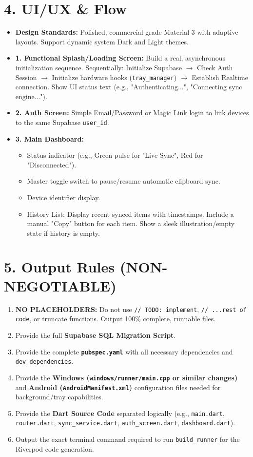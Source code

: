\documentclass[11pt, a4paper]{article}
\begin{document}
\section*{4. UI/UX \& Flow}
\begin{itemize}
    \item \textbf{Design Standards:} Polished, commercial-grade Material 3 with adaptive layouts. Support dynamic system Dark and Light themes.
    \item \textbf{1. Functional Splash/Loading Screen:} Build a real, asynchronous initialization sequence. Sequentially: Initialize Supabase $\rightarrow$ Check Auth Session $\rightarrow$ Initialize hardware hooks (\texttt{tray\_manager}) $\rightarrow$ Establish Realtime connection. Show UI status text (e.g., "Authenticating...", "Connecting sync engine...").
    \item \textbf{2. Auth Screen:} Simple Email/Password or Magic Link login to link devices to the same Supabase \texttt{user\_id}.
    \item \textbf{3. Main Dashboard:}
    \begin{itemize}
        \item Status indicator (e.g., Green pulse for "Live Sync", Red for "Disconnected").
        \item Master toggle switch to pause/resume automatic clipboard sync.
        \item Device identifier display.
        \item History List: Display recent synced items with timestamps. Include a manual "Copy" button for each item. Show a sleek illustration/empty state if history is empty.
    \end{itemize}
\end{itemize}

\section*{5. Output Rules (NON-NEGOTIABLE)}
\begin{enumerate}
    \item \textbf{NO PLACEHOLDERS:} Do not use \texttt{// TODO: implement}, \texttt{// ...rest of code}, or truncate functions. Output 100\% complete, runnable files.
    \item Provide the full \textbf{Supabase SQL Migration Script}.
    \item Provide the complete \textbf{\texttt{pubspec.yaml}} with all necessary dependencies and \texttt{dev\_dependencies}.
    \item Provide the \textbf{Windows (\texttt{windows/runner/main.cpp} or similar changes)} and \textbf{Android (\texttt{AndroidManifest.xml})} configuration files needed for background/tray capabilities.
    \item Provide the \textbf{Dart Source Code} separated logically (e.g., \texttt{main.dart}, \texttt{router.dart}, \texttt{sync\_service.dart}, \texttt{auth\_screen.dart}, \texttt{dashboard.dart}).
    \item Output the exact terminal command required to run \texttt{build\_runner} for the Riverpod code generation.
\end{enumerate}
\end{document}
